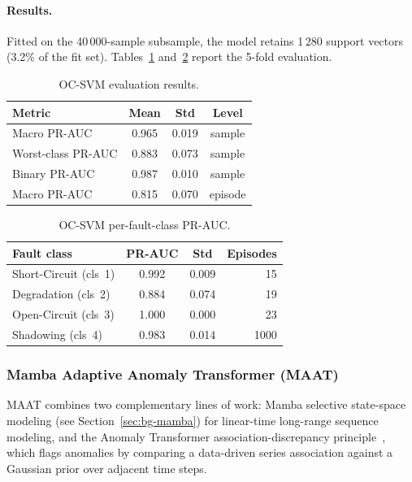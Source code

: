 \paragraph{Results.}
Fitted on the 40\,000-sample subsample, the model retains 1\,280 support vectors (3.2\% of the fit set). Tables~\ref{tab:ocsvm-results} and~\ref{tab:ocsvm-per-class} report the 5-fold evaluation.

\begin{table}[H]
\centering
\caption{OC-SVM evaluation results.\label{tab:ocsvm-results}}
\begin{tabular}{lccc}
\toprule
\textbf{Metric} & \textbf{Mean} & \textbf{Std} & \textbf{Level} \\
\midrule
Macro PR-AUC & 0.965 & 0.019 & sample \\
Worst-class PR-AUC     & 0.883 & 0.073 & sample \\
Binary PR-AUC          & 0.987 & 0.010 & sample \\
Macro PR-AUC & 0.815 & 0.070 & episode \\
\bottomrule
\end{tabular}
\end{table}

\begin{table}[H]
\centering
\caption{OC-SVM per-fault-class PR-AUC.\label{tab:ocsvm-per-class}}
\begin{tabular}{lccr}
\toprule
\textbf{Fault class} & \textbf{PR-AUC} & \textbf{Std} & \textbf{Episodes} \\
\midrule
Short-Circuit (cls~1) & 0.992 & 0.009 & 15 \\
Degradation   (cls~2) & 0.884 & 0.074 & 19 \\
Open-Circuit  (cls~3) & 1.000 & 0.000 & 23 \\
Shadowing     (cls~4) & 0.983 & 0.014 & 1000 \\
\bottomrule
\end{tabular}
\end{table}

\subsubsection{Mamba Adaptive Anomaly Transformer (MAAT)}

MAAT combines two complementary lines of work: Mamba selective state-space modeling (see Section~\ref{sec:bg-mamba}) for linear-time long-range sequence modeling, and the Anomaly Transformer association-discrepancy principle~\citep{xu2022anomaly}, which flags anomalies by comparing a data-driven series association against a Gaussian prior over adjacent time steps.

